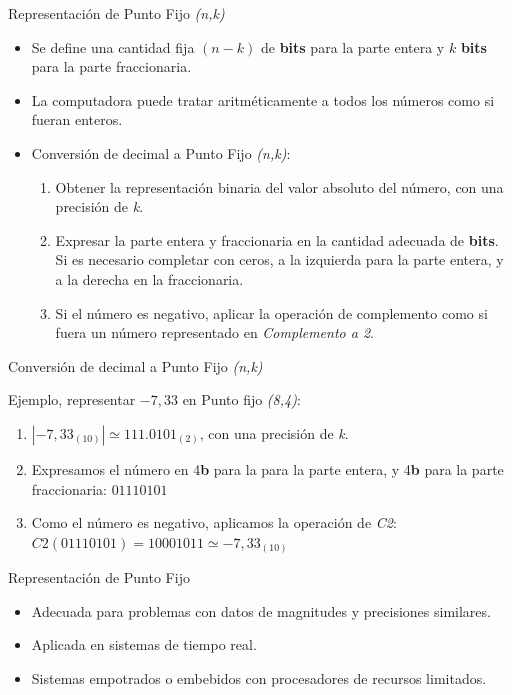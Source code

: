 \documentclass[11pt,a4paper,spanish]{beamer}
\newcommand{\bit}{\textbf{b}}
\begin{document}
\begin{frame}{Representación de Punto Fijo \emph{(n,k)}}
\begin{itemize}
    \item Se define una cantidad fija \((n-k)\) de \textbf{bits} para la parte
        entera y \(k\) \textbf{bits} para la parte fraccionaria.
    \item La computadora puede tratar aritméticamente a todos los números como
        si fueran enteros.
    \item Conversión de decimal a Punto Fijo \emph{(n,k)}:
    \begin{enumerate}
        \item Obtener la representación binaria del valor absoluto del número,
            con una precisión de \emph{k}.
        \item Expresar la parte entera y fraccionaria en la cantidad adecuada
            de \textbf{bits}. Si es necesario completar con ceros, a la
            izquierda para la parte entera, y a la derecha en la fraccionaria.
        \item Si el número es negativo, aplicar la operación de complemento
            como si fuera un número representado en \emph{Complemento a 2}.
    \end{enumerate}
\end{itemize}
\end{frame}

\begin{frame}{Conversión de decimal a Punto Fijo \emph{(n,k)}}

    Ejemplo, representar \(-7,33\) en Punto fijo \emph{(8,4)}:\pause

    \begin{enumerate}
        \item \(|-7,33_{(10)}| \simeq 111.0101_{(2)}\), con una precisión de
            \emph{k}.
            \pause
        \item Expresamos el número en 4\bit{} para la para la parte entera, y
            4\bit{} para la parte fraccionaria: \(01110101\)
            \pause
        \item Como el número es negativo, aplicamos la operación de \emph{C2}:
            \(C2(01110101) = 10001011 \simeq -7,33_{(10)}\)
    \end{enumerate}
\end{frame}

\begin{frame}{Representación de Punto Fijo}
\begin{itemize}
    \item Adecuada para problemas con datos de magnitudes y precisiones
        similares.
    \item Aplicada en sistemas de tiempo real.
    \item Sistemas empotrados o embebidos con procesadores de recursos
        limitados.
\end{itemize}
\end{frame}
\end{document}
